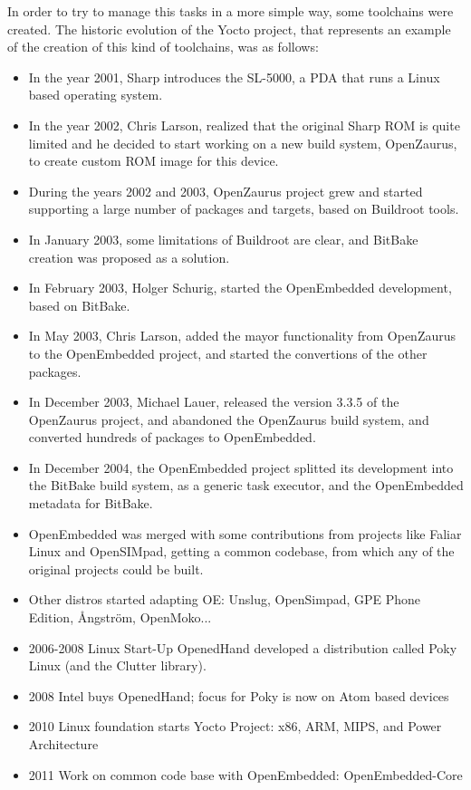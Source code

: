 \documentclass[a4paper,11pt,openany]{report}
\begin{document}
In order to try to manage this tasks in a more simple way, some toolchains were created. The historic evolution of the Yocto project, that represents an example of the creation of this kind of toolchains, was as follows:

\begin{itemize}
\item In the year 2001, Sharp introduces the SL-5000, a PDA that runs a Linux based operating system.
\item In the year 2002, Chris Larson, realized that the original Sharp ROM is quite limited and he decided to start working on a new build system, OpenZaurus\cite{openzaurus}, to create custom ROM image for this device.
\item During the years 2002 and 2003, OpenZaurus project grew and started supporting a large number of packages and targets, based on Buildroot\cite{buildroot} tools.
\item In January 2003, some limitations of Buildroot are clear, and BitBake\cite{bitbake} creation was proposed as a solution.
\item In February 2003, Holger Schurig, started the OpenEmbedded development, based on BitBake.
\item In May 2003, Chris Larson, added the mayor functionality from OpenZaurus to the OpenEmbedded project, and started the convertions of the other packages.
\item In December 2003, Michael Lauer, released the version 3.3.5 of the OpenZaurus project, and abandoned the OpenZaurus build system, and converted hundreds of packages to OpenEmbedded.
\item In December 2004, the OpenEmbedded project splitted its development into the BitBake build system, as a generic task executor, and the OpenEmbedded metadata for BitBake.
\item OpenEmbedded was merged with some contributions from projects like Faliar Linux and OpenSIMpad, getting a common codebase, from which any of the original projects could be built.
\item Other distros started adapting OE: Unslug, OpenSimpad, GPE Phone Edition, {\AA}ngstr\"om, OpenMoko... 
\item 2006-2008 Linux Start-Up OpenedHand developed a distribution called Poky Linux\cite{poky} (and the Clutter library).
\item 2008 Intel buys OpenedHand; focus for Poky is now on Atom based devices
\item 2010 Linux foundation starts Yocto Project: x86, ARM, MIPS, and Power Architecture
\item 2011 Work on common code base with OpenEmbedded: OpenEmbedded-Core 
\end{itemize}
\end{document}
